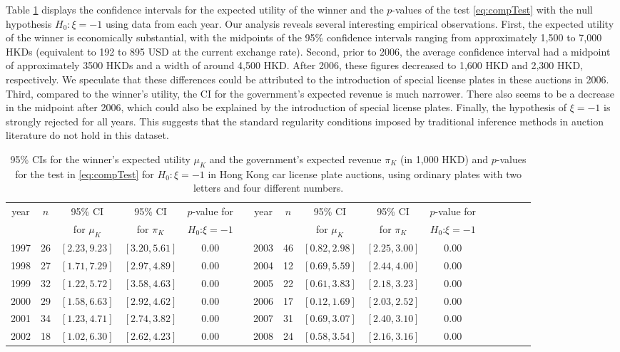 Table \ref{tab:case3} displays the confidence intervals for the expected utility of the winner and the $p$-values of the test \eqref{eq:compTest} with the null hypothesis $H_{0}:\xi=-1$ using data from each year. Our analysis reveals several interesting empirical observations. First, the expected utility of the winner is economically substantial, with the midpoints of the 95\% confidence intervals ranging from approximately 1,500 to 7,000 HKDs (equivalent to 192 to 895 USD at the current exchange rate). Second, prior to 2006, the average confidence interval had a midpoint of approximately 3500 HKDs and a width of around 4,500 HKD. After 2006, these figures decreased to 1,600 HKD and 2,300 HKD, respectively. We speculate that these differences could be attributed to the introduction of special license plates in these auctions in 2006. Third, compared to the winner's utility, the CI for the government's expected revenue is much narrower. There also seems to be a decrease in the midpoint after 2006, which could also be explained by the introduction of special license plates. Finally, the hypothesis of $\xi =-1$ is strongly rejected for all years. This suggests that the standard regularity conditions imposed by traditional inference methods in auction literature do not hold in this dataset.

\begin{table}[ht]
\centering
\renewcommand{\arraystretch}{1.5}
 \begin{adjustbox}{max width=\textwidth}
\begin{tabular}{cccccccccccccccc}
\hline\hline
year & $n$ & 95\% CI & 95\% CI & $p$-value for &  & year & $n$ & 95\% CI & 
95\% CI & $p$-value for \\ 
&  & for $\mu _{K}$ & for $\pi _{K}$ & $H_{0}$:$\xi =-1$ &  &  &  & for $\mu_{K}$ & for $\pi _{K}$ & $H_{0}$:$\xi =-1$ \\ \hline
1997 & 26 & $[2.23,9.23]$ & $[3.20,5.61]$ & $0.00$ &  & 2003 & 46 & $[0.82,2.98]$ & $[2.25,3.00]$ & $0.00$ \\ 
1998 & 27 & $[1.71,7.29]$ & $[2.97,4.89]$ & $0.00$ &  & 2004 & 12 & $[0.69,5.59]$ & $[2.44,4.00]$ & $0.00$ \\ 
1999 & 32 & $[1.22,5.72]$ & $[3.58,4.63]$ & $0.00$ &  & 2005 & 22 & $[0.61,3.83]$ & $[2.18,3.23]$ & $0.00$ \\ 
2000 & 29 & $[1.58,6.63]$ & $[2.92,4.62]$ & $0.00$ &  & 2006 & 17 & $[0.12,1.69]$ & $[2.03,2.52]$ & $0.00$ \\ 
2001 & 34 & $[1.23,4.71]$ & $[2.74,3.82]$ & $0.00$ &  & 2007 & 31 & $[0.69,3.07]$ & $[2.40,3.10]$ & $0.00$ \\ 
2002 & 18 & $[1.02,6.30]$ & $[2.62,4.23]$ & $0.00$ &  & 2008 & 24 & $[0.58,3.54]$ & $[2.16,3.16]$ & $0.00$ \\ \hline\hline
\end{tabular}
\end{adjustbox}
\caption{95\% CIs for the winner's expected utility $\mu_K$ and the government's expected revenue $\pi_K$ (in 1,000 HKD) and $p$-values for the test in \eqref{eq:compTest} for $H_0:\xi = -1$ in Hong Kong car license plate auctions, using ordinary plates with two letters and four different numbers. }\label{tab:case3}
\end{table}
